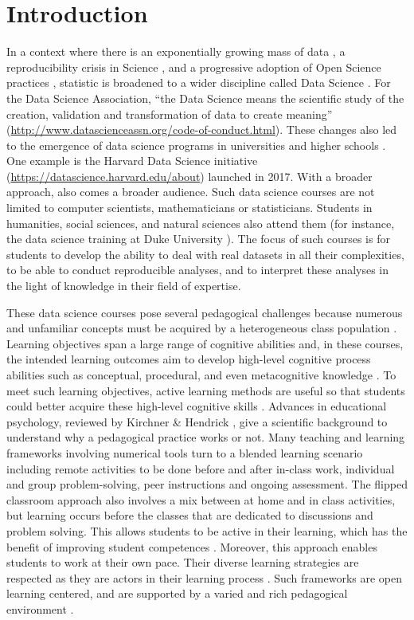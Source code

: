 \documentclass{aims}
\theoremstyle{definition}
\begin{document}
\hypertarget{introduction}{%
\section{Introduction}\label{introduction}}

In a context where there is an exponentially growing mass of data
\cite{Marx2013}, a reproducibility crisis in Science \cite{Baker2016},
and a progressive adoption of Open Science practices \cite{Banks2019},
statistic is broadened to a wider discipline called Data Science
\cite{Cleveland2001}. For the Data Science Association, ``the Data
Science means the scientific study of the creation, validation and
transformation of data to create meaning''
(\url{http://www.datascienceassn.org/code-of-conduct.html}). These
changes also led to the emergence of data science programs in
universities and higher schools \cite{Donoho2017, Cetinkaya-Rundel2021}.
One example is the Harvard Data Science initiative
(\url{https://datascience.harvard.edu/about}) launched in 2017. With a
broader approach, also comes a broader audience. Such data science
courses are not limited to computer scientists, mathematicians or
statisticians. Students in humanities, social sciences, and natural
sciences also attend them (for instance, the data science training at
Duke University \cite{Cetinkaya-Rundel2021}). The focus of such courses
is for students to develop the ability to deal with real datasets in all
their complexities, to be able to conduct reproducible analyses, and to
interpret these analyses in the light of knowledge in their field of
expertise.

These data science courses pose several pedagogical challenges because
numerous and unfamiliar concepts must be acquired by a heterogeneous
class population \cite{Guzman2019}. Learning objectives span a large
range of cognitive abilities and, in these courses, the intended
learning outcomes aim to develop high-level cognitive process abilities
such as conceptual, procedural, and even metacognitive knowledge
\cite{Krathwohl2002}. To meet such learning objectives, active learning
methods are useful so that students could better acquire these
high-level cognitive skills \cite{Freeman2014}. Advances in educational
psychology, reviewed by Kirchner \& Hendrick \cite{Kirschner2020}, give
a scientific background to understand why a pedagogical practice works
or not. Many teaching and learning frameworks involving numerical tools
turn to a blended learning scenario including remote activities to be
done before and after in-class work, individual and group
problem-solving, peer instructions and ongoing assessment. The flipped
classroom approach also involves a mix between at home and in class
activities, but learning occurs before the classes that are dedicated to
discussions and problem solving. This allows students to be active in
their learning, which has the benefit of improving student competences
\cite{Freeman2014}. Moreover, this approach enables students to work at
their own pace. Their diverse learning strategies are respected as they
are actors in their learning process \cite{Spadafora2018}. Such
frameworks are open learning centered, and are supported by a varied and
rich pedagogical environment \cite{Burton2011}.
\end{document}
